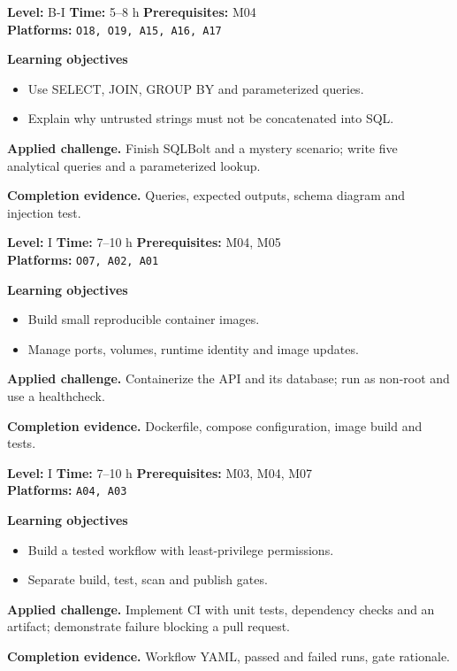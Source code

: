 \documentclass[10pt,letterpaper,oneside]{article}
\begin{document}
\vspace{2.5pt}
\begin{skillbox}[title={M06 \quad SQL and relational data}]
\textbf{Level:} B-I \quad \textbf{Time:} 5--8 h \quad \textbf{Prerequisites:} M04\\
\textbf{Platforms:} \texttt{O18, O19, A15, A16, A17}\par
\textbf{Learning objectives}
\begin{itemize}
\item Use SELECT, JOIN, GROUP BY and parameterized queries.
\item Explain why untrusted strings must not be concatenated into SQL.
\end{itemize}
\textbf{Applied challenge.} Finish SQLBolt and a mystery scenario; write five analytical queries and a parameterized lookup.\par
\textbf{Completion evidence.} Queries, expected outputs, schema diagram and injection test.\par
\end{skillbox}
\vspace{2.5pt}
\begin{skillbox}[title={M07 \quad Docker and container fundamentals}]
\textbf{Level:} I \quad \textbf{Time:} 7--10 h \quad \textbf{Prerequisites:} M04, M05\\
\textbf{Platforms:} \texttt{O07, A02, A01}\par
\textbf{Learning objectives}
\begin{itemize}
\item Build small reproducible container images.
\item Manage ports, volumes, runtime identity and image updates.
\end{itemize}
\textbf{Applied challenge.} Containerize the API and its database; run as non-root and use a healthcheck.\par
\textbf{Completion evidence.} Dockerfile, compose configuration, image build and tests.\par
\end{skillbox}
\vspace{2.5pt}
\begin{skillbox}[title={M08 \quad Continuous integration and delivery}]
\textbf{Level:} I \quad \textbf{Time:} 7--10 h \quad \textbf{Prerequisites:} M03, M04, M07\\
\textbf{Platforms:} \texttt{A04, A03}\par
\textbf{Learning objectives}
\begin{itemize}
\item Build a tested workflow with least-privilege permissions.
\item Separate build, test, scan and publish gates.
\end{itemize}
\textbf{Applied challenge.} Implement CI with unit tests, dependency checks and an artifact; demonstrate failure blocking a pull request.\par
\textbf{Completion evidence.} Workflow YAML, passed and failed runs, gate rationale.\par
\end{skillbox}
\end{document}
